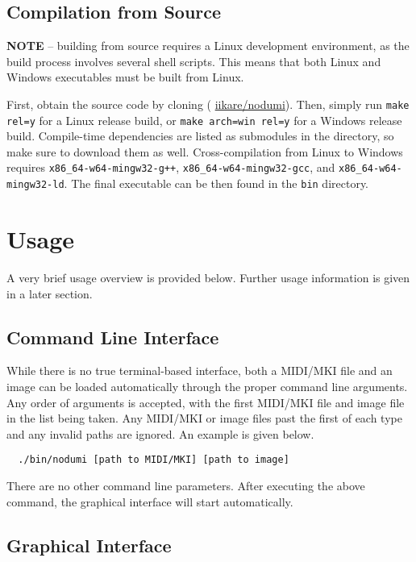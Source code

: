 \documentclass[english]{article}
\providecommand{\mi}[1]{\texttt{#1}}
\begin{document}
\subsection{Compilation from Source}

\textbf{NOTE} -- building from source requires a Linux development environment, as the build process involves several
shell scripts. This means that both Linux and Windows executables must be built from Linux.

\vspace{1em}

First, obtain the source code by cloning 
\textcolor{lcol}{(\raisebox{-0.1\height}{\faGithub} \href{https://github.com/iikare/nodumi}{iikare/nodumi})}.
Then, simply run \mi{make rel=y} for a Linux release build, or \mi{make arch=win rel=y} for a Windows release build.
Compile-time dependencies are listed as submodules in the directory, so make sure to download them as well. Cross-compilation
from Linux to Windows requires 
\mi{x86_64-w64-mingw32-g++},
\mi{x86_64-w64-mingw32-gcc}, and
\mi{x86_64-w64-mingw32-ld}. The final executable can be then found in the \mi{bin} directory.

\section{Usage}

A very brief usage overview is provided below. Further usage information is given in a later section.

\subsection{Command Line Interface}

While there is no true terminal-based interface, both a MIDI/MKI file and an image can be loaded automatically through
the proper command line arguments. Any order of arguments is accepted, with the first MIDI/MKI file and image file in the list
being taken. Any MIDI/MKI or image files past the first of each type and any invalid paths are ignored. An example is given below.

\begin{verbatim}
  ./bin/nodumi [path to MIDI/MKI] [path to image]
\end{verbatim}

There are no other command line parameters. After executing the above command, the graphical interface will start automatically. 

\subsection{Graphical Interface}
\end{document}
